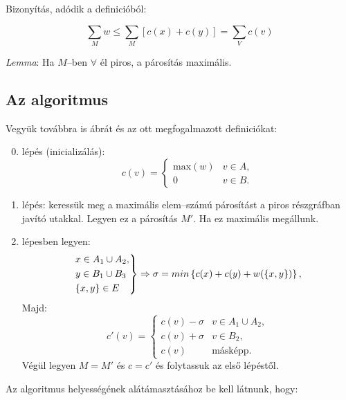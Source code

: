 Bizonyítás, adódik a definicióból:

\begin{displaymath}
\sum_M{w} \leq \sum_M{\left[c(x)+c(y)\right]} = \sum_V{c(v)}
\end{displaymath}

\emph{Lemma}: Ha $M$--ben $\forall$ él piros, a párosítás maximális.

\subsection{Az algoritmus}

Vegyük továbbra is  ábrát és az ott megfogalmazott definiciókat:

\begin{enumerate}
  \setcounter{enumi}{-1}
  \item lépés (inicializálás):   \begin{displaymath}
  c(v)=\begin{cases}
  \mbox{max}(w) & v \in A, \\
  0             & v \in B.
  \end{cases} 
  \end{displaymath}
  \item lépés: keressük meg a maximális elem--számú párosítást a piros részgráfban
  javító utakkal.
  Legyen ez a párosítás $M'$. Ha ez maximális megállunk.
  \item lépesben legyen:
  \begin{displaymath}
  \begin{rcases}
  x \in A_1 \cup A_2, \\
  y \in B_1 \cup B_3\\
  \{x,y\} \in E
  \end{rcases}
  \Rightarrow \sigma= min\left\{c(x) + c(y) + w(\left\{x,y\right\}) \right\},
  \end{displaymath}
  Majd: \begin{displaymath}
  c'(v)=\begin{cases}
  c(v)-\sigma & v \in A_1 \cup A_2, \\
  c(v)+\sigma & v \in B_2, \\
  c(v) 		   &  \mbox{másképp.}
  \end{cases} 
  \end{displaymath}
  Végül legyen $M=M'$ és $c=c'$ és folytassuk az első lépéstől.
\end{enumerate} 

Az algoritmus helyességének alátámasztásához be kell látnunk, hogy:

